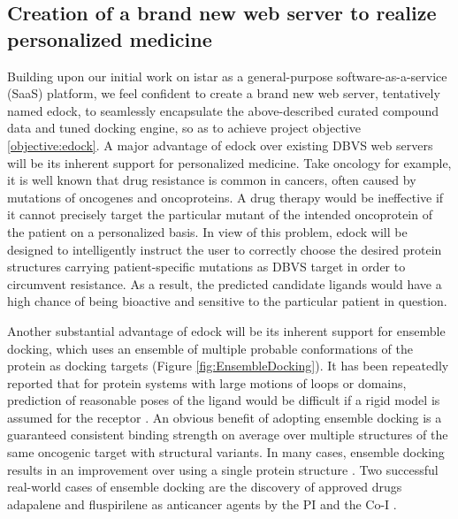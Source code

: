 \documentclass[a4paper,12pt]{article}
\begin{document}



\subsection*{Creation of a brand new web server to realize personalized medicine}

Building upon our initial work on istar \citep{1362} as a general-purpose software-as-a-service (SaaS) platform, we feel confident to create a brand new web server, tentatively named edock, to seamlessly encapsulate the above-described curated compound data and tuned docking engine, so as to achieve project objective \ref{objective:edock}. A major advantage of edock over existing DBVS web servers will be its inherent support for personalized medicine. Take oncology for example, it is well known that drug resistance is common in cancers, often caused by mutations of oncogenes and oncoproteins. A drug therapy would be ineffective if it cannot precisely target the particular mutant of the intended oncoprotein of the patient on a personalized basis. In view of this problem, edock will be designed to intelligently instruct the user to correctly choose the desired protein structures carrying patient-specific mutations as DBVS target in order to circumvent resistance. As a result, the predicted candidate ligands would have a high chance of being bioactive and sensitive to the particular patient in question.

Another substantial advantage of edock will be its inherent support for ensemble docking, which uses an ensemble of multiple probable conformations of the protein as docking targets (Figure \ref{fig:EnsembleDocking}). It has been repeatedly reported that for protein systems with large motions of loops or domains, prediction of reasonable poses of the ligand would be difficult if a rigid model is assumed for the receptor \citep{1730}. An obvious benefit of adopting ensemble docking is a guaranteed consistent binding strength on average over multiple structures of the same oncogenic target with structural variants. In many cases, ensemble docking results in an improvement over using a single protein structure \citep{1128}. Two successful real-world cases of ensemble docking are the discovery of approved drugs adapalene and fluspirilene as anticancer agents by the PI and the Co-I \citep{1667,1681}.
\end{document}
